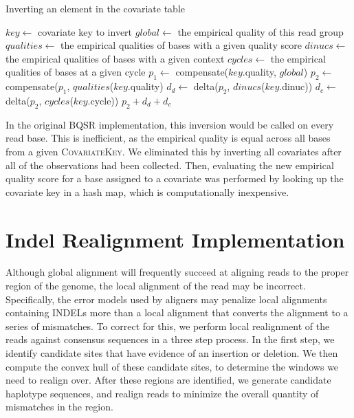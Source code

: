 \documentclass[phd]{ucbthesis}
\begin{document}
\begin{algorithm}
\caption{Inverting an element in the covariate table}
\label{alg:create-table}
\begin{algorithmic}
\STATE $key \leftarrow$ covariate key to invert
\STATE $global \leftarrow$ the empirical quality of this read group
\STATE $qualities \leftarrow$ the empirical qualities of bases with a given quality score
\STATE $dinucs \leftarrow$ the empirical qualities of bases with a given context
\STATE $cycles \leftarrow$ the empirical qualities of bases at a given cycle
\STATE $p_1 \leftarrow$ compensate($key$.quality, $global$)
\STATE $p_2 \leftarrow$ compensate($p_1$, $qualities$($key$.quality)
\STATE $d_d \leftarrow$ delta($p_2$, $dinucs$($key$.dinuc))
\STATE $d_c \leftarrow$ delta($p_2$, $cycles$($key$.cycle))
\RETURN $p_2 + d_d + d_c$
\end{algorithmic}
\end{algorithm}

In the original BQSR implementation, this inversion would be called on every
read base. This is inefficient, as the empirical quality is equal across all
bases from a given \textsc{CovariateKey}. We eliminated this by inverting all
covariates after all of the observations had been collected. Then, evaluating
the new empirical quality score for a base assigned to a covariate was performed
by looking up the covariate key in a hash map, which is computationally
inexpensive.

\section{Indel Realignment Implementation}
\label{sec:indel-realignment-implementation}

Although global alignment will frequently succeed at aligning reads to the proper region of the genome, the local
alignment of the read may be incorrect. Specifically, the error models used by aligners may penalize local alignments
containing INDELs more than a local alignment that converts the alignment to a series of mismatches. To correct
for this, we perform local realignment of the reads against consensus sequences in a three step
process. In the first step, we identify candidate sites that have evidence of an insertion or deletion. We then compute
the convex hull of these candidate sites, to determine the windows we need to realign over. After these regions are
identified, we generate candidate haplotype sequences, and realign reads to minimize the overall quantity of mismatches
in the region.
\end{document}
